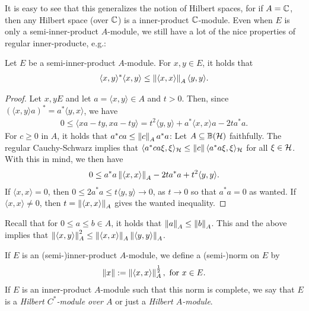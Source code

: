 It is easy to see that this generalizes the notion of Hilbert spaces, for if $A= \mathbb{C}$, then any Hilbert space (over $\mathbb{C}$) is a inner-product $\mathbb{C}$-module. Even when $E$ is only a semi-inner-product $A$-module, we still have a lot of the nice properties of regular inner-producte, e.g.:
\begin{proposition}
Let $E$ be a semi-inner-product $A$-module. For $x,y \in E$, it holds that
\begin{align*}
	\langle x,y\rangle^* \langle x,y \rangle \leq \left\lVert \langle x , x \rangle \right\rVert_A \langle y , y \rangle.
\end{align*}
\end{proposition}
\begin{proof}
Let $x,y E$ and let $a = \langle x,y \rangle \in A$ and $t >0$. Then, since $(\langle x,y \rangle a)^* = a^*\langle y,x\rangle$, we have
\begin{align*}
	0 \leq \langle xa-ty,xa-ty\rangle =t^2\langle y,y \rangle + a^* \langle x,x \rangle a-2ta^*a.
\end{align*}
For $c \geq 0 $ in $A$, it holds that $a^*c a \leq \left\lVert c \right\rVert_A a^*a$: Let $A \subseteq \mathbb{B}(\mathcal{H})$ faithfully. The regular Cauchy-Schwarz implies that $\langle a^*ca \xi,\xi\rangle_{\mathcal{H}} \leq \left\lVert c \right\rVert \langle a^*a \xi,\xi\rangle_{\mathcal{H}}$ for all $ \xi \in \mathcal{H}$. With this in mind, we then have
\begin{align*}
	0 \leq  a^*a \left\lVert \langle x , x \rangle \right\rVert_A -2t a^*a + t^2 \langle y, y \rangle.
\end{align*}
If $\langle x , x \rangle = 0$, then $0 \leq 2a^*a \leq t \langle y , y\rangle \to 0$, as $t \to 0$ so that $a^*a = 0$ as wanted. If $\langle x , x \rangle \neq 0$, then $t = \left\lVert \langle x,x\rangle\right\rVert_A$ gives the wanted inequality.
\end{proof}
Recall that for $0 \leq a \leq b \in A$, it holds that $\left\lVert a \right\rVert_A \leq \left\lVert b \right\rVert_A$. This and the above implies that $\left\lVert \langle x,y \rangle\right\rVert_A^2 \leq \left\lVert \langle x, x \rangle \right\rVert_A \left\lVert \langle y,y\rangle \right\rVert_A$. 
\begin{definition}
	If $E$ is an (semi-)inner-product $A$-module, we define a (semi-)norm on $E$ by
	\begin{align*}
		\left\lVert x \right\rVert := \left\lVert \langle x , x \rangle\right\rVert_A^{\frac12}, \text{ for } x \in E.
	\end{align*}
	If $E$ is an inner-product $A$-module such that this norm is complete, we say that $E$ is a \emph{Hilbert $C^*$-module over $A$} or just a \emph{Hilbert $A$-module}.
\end{definition}
